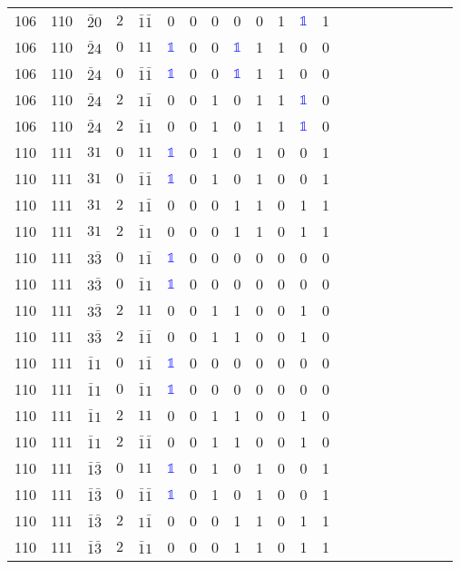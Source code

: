 \begin{longtable*}{c| cccccccccccccccccccc }
106& 110& $\bar{2}0$& $2$& $\bar{1}\bar{1}$& 0& 0& 0& 0& 0& 1& \textcolor{blue}{$\mathds{1}$}& 1\\
106& 110& $\bar{2}4$& $0$& $11$& \textcolor{blue}{$\mathds{1}$}& 0& 0& \textcolor{blue}{$\mathds{1}$}& 1& 1& 0& 0\\
106& 110& $\bar{2}4$& $0$& $\bar{1}\bar{1}$& \textcolor{blue}{$\mathds{1}$}& 0& 0& \textcolor{blue}{$\mathds{1}$}& 1& 1& 0& 0\\
106& 110& $\bar{2}4$& $2$& $1\bar{1}$& 0& 0& 1& 0& 1& 1& \textcolor{blue}{$\mathds{1}$}& 0\\
106& 110& $\bar{2}4$& $2$& $\bar{1}1$& 0& 0& 1& 0& 1& 1& \textcolor{blue}{$\mathds{1}$}& 0\\
110& 111& $31$& $0$& $11$& \textcolor{blue}{$\mathds{1}$}& 0& 1& 0& 1& 0& 0& 1\\
110& 111& $31$& $0$& $\bar{1}\bar{1}$& \textcolor{blue}{$\mathds{1}$}& 0& 1& 0& 1& 0& 0& 1\\
110& 111& $31$& $2$& $1\bar{1}$& 0& 0& 0& 1& 1& 0& 1& 1\\
110& 111& $31$& $2$& $\bar{1}1$& 0& 0& 0& 1& 1& 0& 1& 1\\
110& 111& $3\bar{3}$& $0$& $1\bar{1}$& \textcolor{blue}{$\mathds{1}$}& 0& 0& 0& 0& 0& 0& 0\\
110& 111& $3\bar{3}$& $0$& $\bar{1}1$& \textcolor{blue}{$\mathds{1}$}& 0& 0& 0& 0& 0& 0& 0\\
110& 111& $3\bar{3}$& $2$& $11$& 0& 0& 1& 1& 0& 0& 1& 0\\
110& 111& $3\bar{3}$& $2$& $\bar{1}\bar{1}$& 0& 0& 1& 1& 0& 0& 1& 0\\
110& 111& $\bar{1}1$& $0$& $1\bar{1}$& \textcolor{blue}{$\mathds{1}$}& 0& 0& 0& 0& 0& 0& 0\\
110& 111& $\bar{1}1$& $0$& $\bar{1}1$& \textcolor{blue}{$\mathds{1}$}& 0& 0& 0& 0& 0& 0& 0\\
110& 111& $\bar{1}1$& $2$& $11$& 0& 0& 1& 1& 0& 0& 1& 0\\
110& 111& $\bar{1}1$& $2$& $\bar{1}\bar{1}$& 0& 0& 1& 1& 0& 0& 1& 0\\
110& 111& $\bar{1}\bar{3}$& $0$& $11$& \textcolor{blue}{$\mathds{1}$}& 0& 1& 0& 1& 0& 0& 1\\
110& 111& $\bar{1}\bar{3}$& $0$& $\bar{1}\bar{1}$& \textcolor{blue}{$\mathds{1}$}& 0& 1& 0& 1& 0& 0& 1\\
110& 111& $\bar{1}\bar{3}$& $2$& $1\bar{1}$& 0& 0& 0& 1& 1& 0& 1& 1\\
110& 111& $\bar{1}\bar{3}$& $2$& $\bar{1}1$& 0& 0& 0& 1& 1& 0& 1& 1\\

\end{longtable*}
